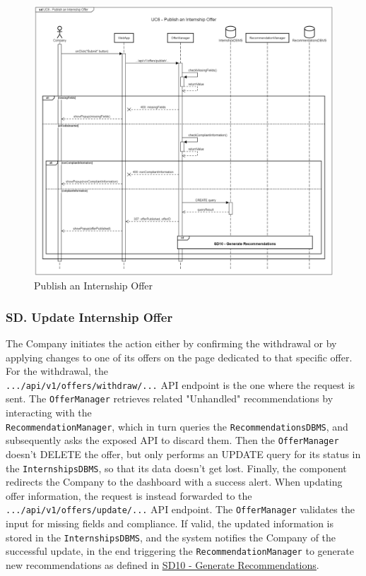 \begin{figure}[H]
    \begin{center}
         \includegraphics[width=1\linewidth]{LaTeXCode/images/SequenceDiagrams/UC6-sequenceDiagram.png}
         \caption{Publish an Internship Offer}
         \label{fig:publish_offer_sd}
     \end{center}
\end{figure}

\subsubsection*{SD\cuc. Update Internship Offer}
\label{subsubsec:update_internship_offer_sd}
The Company initiates the action either by confirming the withdrawal or by applying changes to one of its offers on the page dedicated to that specific offer. For the withdrawal, the \\ \texttt{.../api/v1/offers/withdraw/...} API endpoint is the one where the request is sent. The \texttt{OfferManager} retrieves related "Unhandled" recommendations by interacting with the \\ \texttt{RecommendationManager}, which in turn queries the \texttt{RecommendationsDBMS}, and subsequently asks the exposed API to discard them. Then the \texttt{OfferManager} doesn't DELETE the offer, but only performs an UPDATE query for its status in the \texttt{InternshipsDBMS}, so that its data doesn't get lost. Finally, the component redirects the Company to the dashboard with a success alert.
When updating offer information, the request is instead forwarded to the \texttt{.../api/v1/offers/update/...} API endpoint. The \texttt{OfferManager} validates the input for missing fields and compliance. If valid, the updated information is stored in the \texttt{InternshipsDBMS}, and the system notifies the Company of the successful update, in the end triggering the \texttt{RecommendationManager} to generate new recommendations as defined in \hyperref[fig:generate_recommendations_sd]{\protect\uline{SD10 - Generate Recommendations}}.

